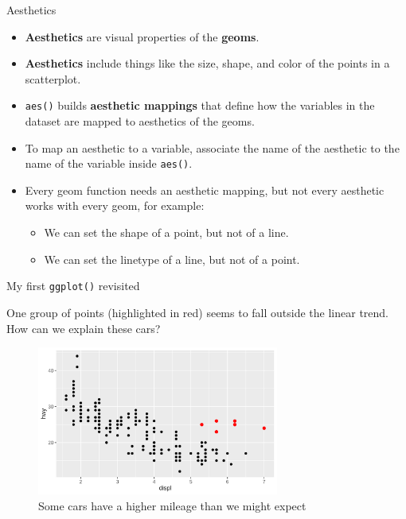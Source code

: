 \documentclass[ignorenonframetext,]{beamer}
\providecommand{\tightlist}{%
  \setlength{\itemsep}{0pt}\setlength{\parskip}{0pt}}
\begin{document}
\begin{frame}[fragile]{Aesthetics}
\protect\hypertarget{aesthetics}{}

\begin{itemize}
\item
  \textbf{Aesthetics} are visual properties of the \textbf{geoms}.
\item
  \textbf{Aesthetics} include things like the size, shape, and color of
  the points in a scatterplot.
\item
  \texttt{aes()} builds \textbf{aesthetic mappings} that define how the
  variables in the dataset are mapped to aesthetics of the geoms.
\item
  To map an aesthetic to a variable, associate the name of the aesthetic
  to the name of the variable inside \texttt{aes()}.
\item
  Every geom function needs an aesthetic mapping, but not every
  aesthetic works with every geom, for example:

  \begin{itemize}
  \tightlist
  \item
    We can set the shape of a point, but not of a line.
  \item
    We can set the linetype of a line, but not of a point.
  \end{itemize}
\end{itemize}

\end{frame}

\begin{frame}{My first \texttt{ggplot()} revisited}
\protect\hypertarget{my-first-ggplot-revisited}{}

One group of points (highlighted in red) seems to fall outside the
linear trend. How can we explain these cars?

\begin{figure}
\centering
\includegraphics[width=3.125in,height=\textheight]{figures/outl.png}
\caption{Some cars have a higher mileage than we might expect}
\end{figure}

\end{frame}
\end{document}
